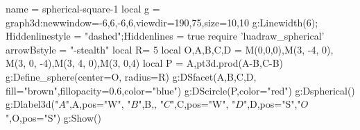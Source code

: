 \documentclass{standalone}
\begin{document}
\begin{luadraw}{name = spherical-square-1}
  local g = graph3d:new{window={-6,6,-6,6},viewdir={190,75},size={10,10}}
  g:Linewidth(6); Hiddenlinestyle = "dashed";Hiddenlines = true
 require 'luadraw_spherical'
 arrowBstyle = "-stealth"
 local R= 5
 local O,A,B,C,D = M(0,0,0),M(3, -4, 0), M(3, 0, -4),M(3, 4, 0),M(3, 0,4)
 local P = {A,pt3d.prod(A-B,C-B)}
 g:Define_sphere({center=O, radius=R})
 g:DSfacet({A,B,C,D}, {fill="brown",fillopacity=0.6,color="blue"})
 g:DScircle(P,{color="red"})
 g:Dspherical()
 g:Dlabel3d("$A$",A,{pos="W"}, "$B$",B,{}, "$C$",C,{pos="W"}, "$D$",D,{pos="S"},"$O$",O,{pos="S"})
 g:Show()
\end{luadraw}
\end{document}
